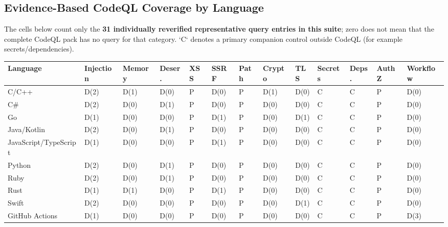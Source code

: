\documentclass[10pt,letterpaper]{article}
\begin{document}
\begin{landscape}
\section{Evidence-Based CodeQL Coverage by Language}
The cells below count only the \textbf{31 individually reverified representative query entries in this suite}; zero does not mean that the complete CodeQL pack has no query for that category. `C` denotes a primary companion control outside CodeQL (for example secrets/dependencies).

\scriptsize
\setlength{\tabcolsep}{1.5pt}
\begin{tabular}{@{}P{0.85in}P{0.62in}P{0.62in}P{0.62in}P{0.62in}P{0.62in}P{0.62in}P{0.62in}P{0.62in}P{0.62in}P{0.62in}P{0.62in}P{0.62in}@{}}
\toprule
\textbf{Language} & \textbf{Injection} & \textbf{Memory} & \textbf{Deser.} & \textbf{XSS} & \textbf{SSRF} & \textbf{Path} & \textbf{Crypto} & \textbf{TLS} & \textbf{Secrets} & \textbf{Deps.} & \textbf{AuthZ} & \textbf{Workflow}\\
\midrule
C/C++ & D(2) & D(1) & D(0) & P & D(0) & P & D(1) & D(0) & C & C & P & D(0)\\
C\# & D(2) & D(0) & D(1) & P & D(0) & P & D(0) & D(0) & C & C & P & D(0)\\
Go & D(1) & D(0) & D(0) & P & D(1) & P & D(0) & D(1) & C & C & P & D(0)\\
Java/Kotlin & D(2) & D(0) & D(1) & P & D(0) & P & D(0) & D(0) & C & C & P & D(0)\\
JavaScript/\allowbreak TypeScript & D(1) & D(0) & D(0) & P & D(1) & P & D(0) & D(0) & C & C & P & D(0)\\
Python & D(2) & D(0) & D(1) & P & D(0) & P & D(0) & D(0) & C & C & P & D(0)\\
Ruby & D(2) & D(0) & D(1) & P & D(0) & P & D(0) & D(0) & C & C & P & D(0)\\
Rust & D(1) & D(1) & D(0) & P & D(1) & P & D(0) & D(0) & C & C & P & D(0)\\
Swift & D(2) & D(0) & D(0) & P & D(0) & P & D(0) & D(1) & C & C & P & D(0)\\
GitHub Actions & D(1) & D(0) & D(0) & P & D(0) & P & D(0) & D(0) & C & C & P & D(3)\\
\bottomrule
\end{tabular}
\normalsize
\end{landscape}
\end{document}
